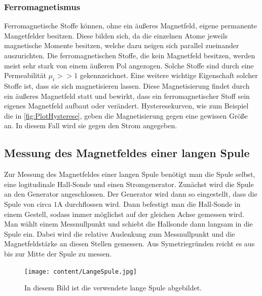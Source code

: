 \subsubsection{Ferromagnetismus}
\label{subsubsec:FERRO}
Ferromagnetische Stoffe können, ohne ein äußeres Magnetfeld, eigene permanente Mangetfelder besitzen. Diese bilden sich, da die einzelnen Atome jeweils magnetische Momente besitzen, welche 
dazu neigen sich parallel zueinander auszurichten. Die ferromagnetischen Stoffe, die kein Magnetfeld besitzen, werden meist sehr stark von einem äußeren Pol angezogen. Solche Stoffe 
sind durch eine Permeabilität $\mu_{\text{r}} >> 1$ gekennzeichnet. Eine weitere wichtige Eigenschaft solcher Stoffe ist, dass sie sich magnetisieren lassen. Diese Magnetisierung findet
durch ein äußeres Magnetfeld statt und bewirkt, dass ein ferromagnetischer Stoff sein eigenes Magnetfeld aufbaut oder verändert. Hysteresekurven, wie zum Beispiel die in \autoref{fig:PlotHysterese},
geben die Magnetisierung gegen eine gewissen Größe an. In diesem Fall wird sie gegen den Strom angegeben.
\subsection{Messung des Magnetfeldes einer langen Spule}
\label{subsec:D_Lange_Spule}
Zur Messung des Magnetfeldes einer langen Spule benötigt man die Spule selbst, eine logitudinale Hall-Sonde und einen Stromgenerator. Zunächst wird die Spule an den Generator angeschlossen.
Der Generator wird dann so eingestellt, dass die Spule von circa $1 \unit{\ampere}$ durchflossen wird. Dann befestigt man die Hall-Sonde in einem Gestell, sodass immer möglichst auf der
gleichen Achse gemessen wird. Man wählt einem Messnullpunkt und schiebt die Hallsonde dann langsam in die Spule ein. Dabei wird die relative Auslenkung zum Messnullpunkt und die Magnetfeldstärke 
an diesen Stellen gemessen. Aus Symetriegründen reicht es aus bis zur Mitte der Spule zu messen.
\begin{figure}
    \centering
    \caption{In diesem Bild ist die verwendete lange Spule abgebildet.}
    \label{fig:Aufbau_lange_Spule}
    \texttt{[image: content/LangeSpule.jpg]}
\end{figure}
